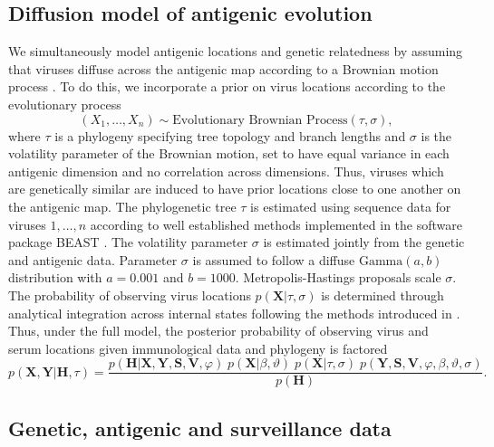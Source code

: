 \documentclass[11pt,oneside,letterpaper]{article}
\newcommand{\mdssd}{\varphi}						%
\newcommand{\diffusionsd}{\sigma}					%
\newcommand{\driftsd}{\vartheta}					%
\newcommand{\tree}{\tau}							%
\newcommand{\vn}{n}									%
\begin{document}
\subsection*{Diffusion model of antigenic evolution}

We simultaneously model antigenic locations and genetic relatedness by assuming that viruses diffuse across the antigenic map according to a Brownian motion process \cite{Lemey10}.
To do this, we incorporate a prior on virus locations according to the evolutionary process
\begin{equation}
	(X_1,\ldots,X_n) \sim \mbox{Evolutionary Brownian Process}(\tree, \diffusionsd),
\end{equation}
where $\tree$ is a phylogeny specifying tree topology and branch lengths and $\diffusionsd$ is the volatility parameter of the Brownian motion,  set to have equal variance in each antigenic dimension and no correlation across dimensions.
Thus, viruses which are genetically similar are induced to have prior locations close to one another on the antigenic map.
The phylogenetic tree $\tree$ is estimated using sequence data for viruses $1,\ldots,\vn$ according to well established methods implemented in the software package BEAST \cite{BEAST, BEAST17}.
The volatility parameter $\diffusionsd$ is estimated jointly from the genetic and antigenic data.
Parameter $\diffusionsd$ is assumed to follow a diffuse $\mbox{Gamma}(a, b)$ distribution with $a=0.001$ and $b=1000$.
Metropolis-Hastings proposals scale $\diffusionsd$.
The probability of observing virus locations $p(\mathbf{X}|\tree,\diffusionsd)$ is determined through analytical integration across internal states following the methods introduced in \cite{Lemey10}.
Thus, under the full model, the posterior probability of observing virus and serum locations given immunological data and phylogeny is factored
\begin{equation}
	p(\mathbf{X},\mathbf{Y} | \mathbf{H},\tree) = \frac{ p(\mathbf{H}|\mathbf{X},\mathbf{Y},\mathbf{S},\mathbf{V}, \mdssd) \; 
	p(\mathbf{X} | \beta, \driftsd) \;
	p(\mathbf{X} | \tree, \diffusionsd) \; 
	p(\mathbf{Y},\mathbf{S},\mathbf{V},\mdssd,\beta,\driftsd,\diffusionsd)}{ p(\mathbf{H}) }.
\end{equation}

\subsection*{Genetic, antigenic and surveillance data}
\end{document}
